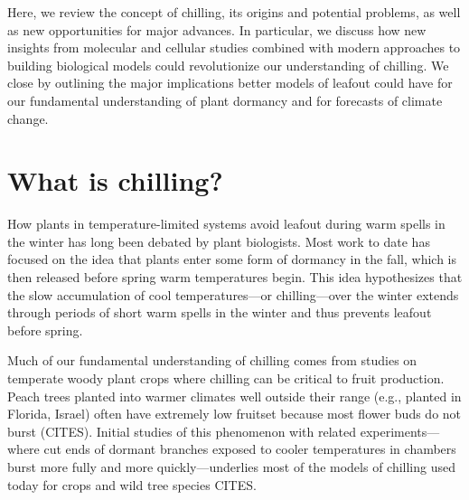 \documentclass[11pt]{article}
\begin{document}
Here, we review the concept of chilling, its origins and potential problems, as well as new opportunities for major advances. In particular, we discuss how new insights from molecular and cellular studies combined with modern approaches to building biological models could revolutionize our understanding of chilling. We close by outlining the major implications better models of leafout could have for our fundamental understanding of plant dormancy and for forecasts of climate change. 

\section*{What is chilling?}

How plants in temperature-limited systems avoid leafout during warm spells in the winter has long been debated by plant biologists. Most work to date has focused on the idea that plants enter some form of dormancy in the fall, which is then released before spring warm temperatures begin. This idea hypothesizes that the slow accumulation of cool temperatures---or chilling---over the winter extends through periods of short warm spells in the winter and thus prevents leafout before spring. 

Much of our fundamental understanding of chilling comes from studies on temperate woody plant crops where chilling can be critical to fruit production. Peach trees planted into warmer climates well outside their range (e.g., planted in Florida, Israel) often have extremely low fruitset because most flower buds do not burst (CITES). Initial studies of this phenomenon with related experiments---where cut ends of dormant branches exposed to cooler temperatures in chambers burst more fully and more quickly---underlies most of the models of chilling used today for crops and wild tree species CITES. %
\end{document}
